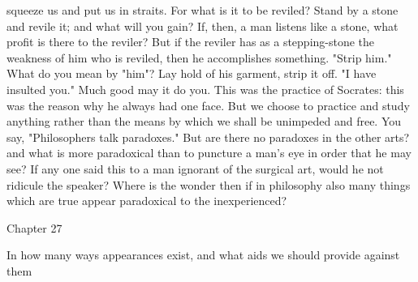 \documentclass[a4paper]{article}
\begin{document}
squeeze us and put us in straits. For what is it to be reviled? Stand by a
stone and revile it; and what will you gain? If, then, a man listens like a
stone, what profit is there to the reviler? But if the reviler has as a
stepping-stone the weakness of him who is reviled, then he accomplishes
something. "Strip him." What do you mean by "him"? Lay hold of his garment,
strip it off. "I have insulted you." Much good may it do you.
    This was the practice of Socrates: this was the reason why he always had
one face. But we choose to practice and study anything rather than the means by
which we shall be unimpeded and free. You say, "Philosophers talk paradoxes."
But are there no paradoxes in the other arts? and what is more paradoxical than
to puncture a man's eye in order that he may see? If any one said this to a man
ignorant of the surgical art, would he not ridicule the speaker? Where is the
wonder then if in philosophy also many things which are true appear paradoxical
to the inexperienced?

Chapter 27

In how many ways appearances exist, and what aids we should provide against
                                     them
\end{document}
